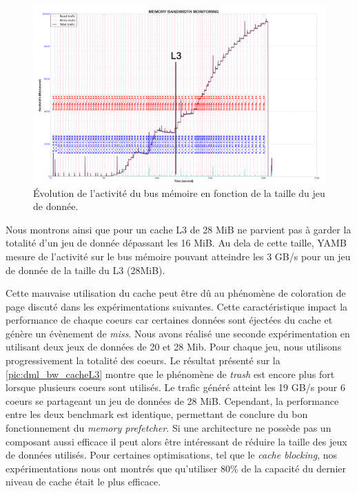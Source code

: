          \begin{figure}
        \center
        \includegraphics[width=14cm]{images/dml_L3_sharing.png}
        \caption{\label{pic:dml_L3_sharing} Évolution de l'activité du bus mémoire en fonction de la taille du jeu de donnée.}
        \end{figure}
        
        Nous montrons ainsi que pour un cache L3 de 28 MiB ne parvient pas à garder la totalité d'un jeu de donnée dépassant les 16 MiB. Au dela de cette taille, YAMB mesure de l'activité sur le bus mémoire pouvant atteindre les 3 GB/s pour un jeu de donnée de la taille du L3 (28MiB). 
        
        
        Cette mauvaise utilisation du cache peut être dû au phénomène de coloration de page discuté dans les expérimentations suivantes. Cette caractéristique impact la performance de chaque coeurs car certaines données sont éjectées du cache et génère un évènement de \textit{miss}. Nous avons réalisé une seconde expérimentation en utilisant deux jeux de données de 20 et 28 Mib. Pour chaque jeu, nous utilisons progressivement la totalité des coeurs. Le résultat présenté sur la \autoref{pic:dml_bw_cacheL3} montre que le phénomène de \textit{trash} est encore plus fort lorsque plusieurs coeurs sont utilisés. Le trafic généré atteint les 19 GB/s pour 6 coeurs se partageant un jeu de données de 28 MiB. Cependant, la performance entre les deux benchmark est identique, permettant de conclure du bon fonctionnement du \textit{memory prefetcher}. Si une architecture ne possède pas un composant aussi efficace il peut alors être intéressant de réduire la taille des jeux de données utilisés. Pour certaines optimisations, tel que le \textit{cache blocking}, nos expérimentations nous ont montrés que qu'utiliser 80\% de la capacité du dernier niveau de cache était le plus efficace.
        
